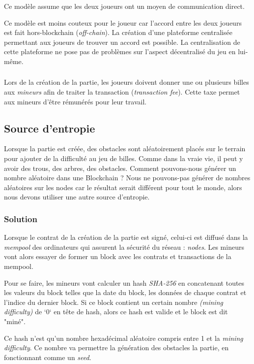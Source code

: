 \documentclass{article}
\begin{document}
Ce modèle assume que les deux joueurs ont un moyen de communication direct.

Ce modèle est moins couteux pour le joueur car l'accord entre les deux joueurs est fait hors-blockchain (\textit{off-chain}).
La création d'une plateforme centralisée permettant aux joueurs de trouver un accord est possible. La centralisation de cette plateforme ne pose pas de problèmes sur l'aspect décentralisé du jeu en lui-même.

\subsubsection*{}
Lors de la création de la partie, les joueurs doivent donner une ou plusieurs billes aux \textit{mineurs} afin de traiter la transaction (\textit{transaction fee}). Cette taxe permet aux mineurs d'être rémunérés pour leur travail.

\subsection{Source d'entropie}
Lorsque la partie est créée, des obstacles sont aléatoirement placés sur le terrain pour ajouter de la difficulté au jeu de billes. Comme dans la vraie vie, il peut y avoir des trous, des arbres, des obstacles. Comment pouvons-nous générer un nombre aléatoire dans une Blockchain ?
Nous ne pouvons-pas générer de nombres aléatoires sur les nodes car le résultat serait différent pour tout le monde, alors nous devons utiliser une autre source d'entropie.

\subsubsection{Solution}

Lorsque le contrat de la création de la partie est signé, celui-ci est diffusé dans la \textit{mempool} des ordinateurs qui assurent la sécurité du réseau : \textit{nodes}. Les mineurs vont alors essayer de former un block avec les contrats et transactions de la mempool.

Pour se faire, les mineurs vont calculer un hash \textit{SHA-256} en concatenant toutes les valeurs du block telles que la date du block, les données de chaque contrat et l'indice du dernier block. Si ce block contient un certain nombre \textit{(mining difficulty)} de `0` en tête de hash, alors ce hash est valide et le block est dit "miné".

Ce hash n'est qu'un nombre hexadécimal aléatoire compris entre 1 et la \textit{mining difficulty}. Ce nombre va permettre la génération des obstacles la partie, en fonctionnant comme un \textit{seed}.
\end{document}
